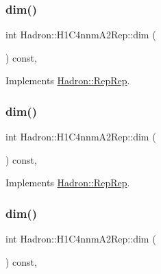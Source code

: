 \subsubsection{\texorpdfstring{dim()}{dim()}\hspace{0.1cm}{\footnotesize\ttfamily [3/5]}}
{\footnotesize\ttfamily int Hadron\+::\+H1\+C4nnm\+A2\+Rep\+::dim (\begin{DoxyParamCaption}{ }\end{DoxyParamCaption}) const\hspace{0.3cm}{\ttfamily [inline]}, {\ttfamily [virtual]}}



Implements \mbox{\hyperlink{structHadron_1_1RepRep_a92c8802e5ed7afd7da43ccfd5b7cd92b}{Hadron\+::\+Rep\+Rep}}.

\mbox{\label{structHadron_1_1H1C4nnmA2Rep_a46f9e7081419a5ffdc3caad2390b5900}} 
\subsubsection{\texorpdfstring{dim()}{dim()}\hspace{0.1cm}{\footnotesize\ttfamily [4/5]}}
{\footnotesize\ttfamily int Hadron\+::\+H1\+C4nnm\+A2\+Rep\+::dim (\begin{DoxyParamCaption}{ }\end{DoxyParamCaption}) const\hspace{0.3cm}{\ttfamily [inline]}, {\ttfamily [virtual]}}



Implements \mbox{\hyperlink{structHadron_1_1RepRep_a92c8802e5ed7afd7da43ccfd5b7cd92b}{Hadron\+::\+Rep\+Rep}}.

\mbox{\label{structHadron_1_1H1C4nnmA2Rep_a46f9e7081419a5ffdc3caad2390b5900}} 
\subsubsection{\texorpdfstring{dim()}{dim()}\hspace{0.1cm}{\footnotesize\ttfamily [5/5]}}
{\footnotesize\ttfamily int Hadron\+::\+H1\+C4nnm\+A2\+Rep\+::dim (\begin{DoxyParamCaption}{ }\end{DoxyParamCaption}) const\hspace{0.3cm}{\ttfamily [inline]}, {\ttfamily [virtual]}}



